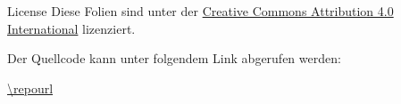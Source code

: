 
\begin{frame}{License}
    Diese Folien sind unter der \href{https://creativecommons.org/licenses/by/4.0/}{Creative Commons Attribution 4.0 International} lizenziert. \ccby
    
    Der Quellcode kann unter folgendem Link abgerufen werden:

    \url{\repourl}
\end{frame}
